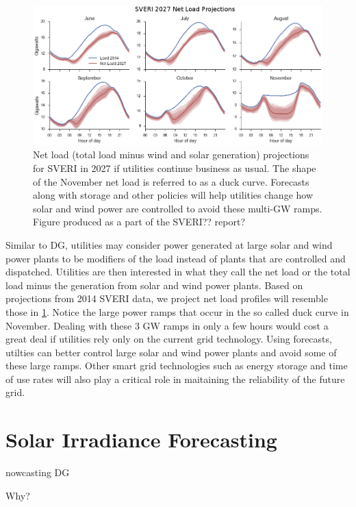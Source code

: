 \begin{figure}[h]
\centering
\includegraphics[width=\textwidth]{figs/duckcurves.png}
\caption[Projected SVERI 2027 duck curves]{Net load (total load minus
  wind and solar generation) projections for SVERI in 2027 if
  utilities continue business as usual. The shape of the November net
  load is referred to as a duck curve. Forecasts along with storage
  and other policies will help utilities change how solar and wind
  power are controlled to avoid these multi-GW ramps. Figure produced
  as a part of the SVERI?? report?}
\label{fig:duckcurves}
\end{figure}

Similar to DG, utilities may consider power generated at large solar
and wind power plants to be modifiers of the load instead of plants
that are controlled and dispatched.
Utilities are then interested in what they call the net load or the
total load minus the generation from solar and wind power plants.
Based on projections from 2014 SVERI data, we project net load
profiles will resemble those in \cref{fig:duckcurves}.
Notice the large power ramps that occur in the so called duck curve in
November.
Dealing with these 3 GW ramps in only a few hours would cost a great
deal if utilities rely only on the current grid technology.
Using forecasts, utilties can better control large solar and wind
power plants and avoid some of these large ramps.
Other smart grid technologies such as energy storage and time of use
rates will also play a critical role in maitaining the reliability of
the future grid.

\section{Solar Irradiance Forecasting}
nowcasting DG

Why?

